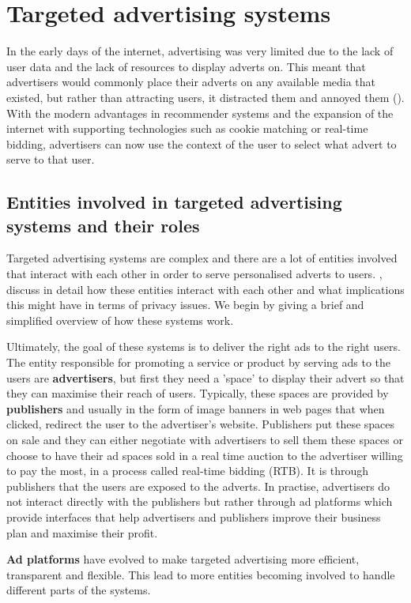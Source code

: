\documentclass{l4proj}
\begin{document}
\section{Targeted advertising systems}
\label{targeted}
In the early days of the internet, advertising was very limited due to the lack of user data and the lack of resources to display adverts on. This meant that advertisers would commonly place their adverts on any available media that existed, but rather than attracting users, it distracted them and annoyed them (\cite{earlyads}). With the modern advantages in recommender systems and the expansion of the internet with supporting technologies such as cookie matching or real-time bidding, advertisers can now use the context of the user to select what advert to serve to that user.    

\subsection{Entities involved in targeted advertising systems and their roles}
Targeted advertising systems are complex and there are a lot of entities involved that interact with each other in order to serve personalised adverts to users. \cite{Estrada-Jimenez2017}, discuss in detail how these entities interact with each other and what implications this might have in terms of privacy issues. We begin by giving a brief and simplified overview of how these systems work. 

Ultimately, the goal of these systems is to deliver the right ads to the right users. The entity responsible for promoting a service or product by serving ads to the users are \textbf{advertisers}, but first they need a 'space' to display their advert so that they can maximise their reach of users. Typically, these spaces are provided by \textbf{publishers} and usually in the form of image banners in web pages that when clicked, redirect the user to the advertiser's website. Publishers put these spaces on sale and they can either negotiate with advertisers to sell them these spaces or choose to have their ad spaces sold in a real time auction to the advertiser willing to pay the most, in a process called real-time bidding (RTB). It is through publishers that the users are exposed to the adverts. In practise, advertisers do not interact directly with the publishers but rather through ad platforms which provide interfaces that help advertisers and publishers improve their business plan and maximise their profit.

\textbf{Ad platforms} have evolved to make targeted advertising more efficient, transparent and flexible. This lead to more entities becoming involved to handle different parts of the systems. 
\end{document}
